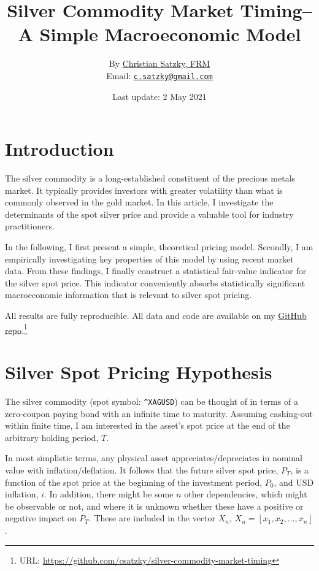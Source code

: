 \documentclass[
  12pt,
]{article}
\title{Silver Commodity Market Timing--\\
A Simple Macroeconomic Model}
\author{By \href{https://www.linkedin.com/in/christian-satzky/}{Christian
Satzky, FRM}\\
Email: \href{mailto:c.satzky@gmail.com}{\nolinkurl{c.satzky@gmail.com}}}
\date{Last update: 2 May 2021}
\begin{document}
\maketitle

\newpage
\hypersetup{linkcolor=black}
\tableofcontents
\newpage
\hypersetup{linkcolor=blue}

\hypertarget{introduction}{%
\section{Introduction}\label{introduction}}

The silver commodity is a long-established constituent of the precious
metals market. It typically provides investors with greater volatility
than what is commonly observed in the gold market. In this article, I
investigate the determinants of the spot silver price and provide a
valuable tool for industry practitioners.

In the following, I first present a simple, theoretical pricing model.
Secondly, I am empirically investigating key properties of this model by
using recent market data. From these findings, I finally construct a
statistical fair-value indicator for the silver spot price. This
indicator conveniently absorbs statistically significant macroeconomic
information that is relevant to silver spot pricing.

All results are fully reproducible. All data and code are available on
my
\href{https://github.com/csatzky/silver-commodity-market-timing}{GitHub
repo}.\footnote{URL:
  \url{https://github.com/csatzky/silver-commodity-market-timing}}

\hypertarget{silver-spot-pricing-hypothesis}{%
\section{Silver Spot Pricing
Hypothesis}\label{silver-spot-pricing-hypothesis}}

The silver commodity (spot symbol: \texttt{\^{}XAGUSD}) can be thought
of in terms of a zero-coupon paying bond with an infinite time to
maturity. Assuming cashing-out within finite time, I am interested in
the asset's spot price at the end of the arbitrary holding period,
\(T\).

In most simplistic terms, any physical asset appreciates/depreciates in
nominal value with inflation/deflation. It follows that the future
silver spot price, \(P_T\), is a function of the spot price at the
beginning of the investment period, \(P_0\), and USD inflation, \(i\).
In addition, there might be some \(n\) other dependencies, which might
be observable or not, and where it is unknown whether these have a
positive or negative impact on \(P_T\). These are included in the vector
\(X_n\), \(X_n = [x_1, x_2,..., x_n]\).
\end{document}
